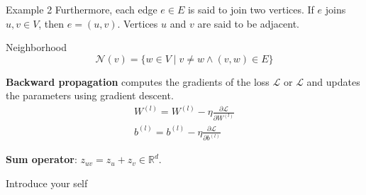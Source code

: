 \documentclass[aspectratio=169]{beamer}
\renewcommand{\alert}[1]{\textbf{\color{swufe}#1}}
\begin{document}
    \begin{frame}{Example 2}
        Furthermore, each edge $e \in E$ is said to join two vertices. If $e$ joins $u, v \in V$, then $e = (u, v)$. Vertices $u$ and $v$ are said to be adjacent.
        
        \begin{alertblock}{Neighborhood}
            \begin{equation}
                \mathcal{N}(v) = \{w \in V \mid v \neq w \land (v, w) \in E\}
            \end{equation}
        \end{alertblock}

        \alert{Backward propagation} computes the gradients of the loss $\mathcal{L}$ or $\mathscr{L}$ and updates the parameters using gradient descent.
        \begin{align}
            W^{(l)} = W^{(l)} - \eta \frac{\partial \mathcal{L}}{\partial W^{(l)}} \\
            b^{(l)} = b^{(l)} - \eta \frac{\partial \mathcal{L}}{\partial b^{(l)}}
        \end{align}

        \alert{Sum operator}: $z_{uv} = z_u + z_v \in \mathbb{R}^d$.

        \begin{note}
            {Introduce your self}
        \end{note}
    \end{frame}
\end{document}
